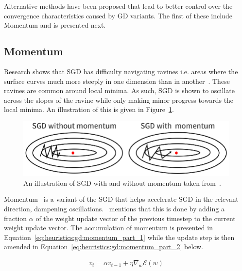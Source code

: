 Alternative methods have been proposed that lead to better control over the convergence characteristics caused by \ac{GD} variants. The first of these include \ac{Momentum} and is presented next.


\subsection{Momentum}
\label{sec:heuristics:gd:momentum}

Research shows that \ac{SGD} has difficulty navigating ravines i.e. areas where the surface curves much more steeply in one dimension than in another~\cite{ref:sutton:1986}. These ravines are common around local minima. As such, \ac{SGD} is shown to oscillate across the slopes of the ravine while only making minor progress towards the local minima. An illustration of this is given in Figure~\ref{fig:heuristics:gd:sgd_with_and_without_momentum}.

\begin{figure}[htbp]
      \includegraphics[width=\textwidth]{images/sgd_with_and_without_momentum.png}
      \caption{An illustration of \ac{SGD} with and without momentum taken from~\cite{ref:du:2019}.}
      \label{fig:heuristics:gd:sgd_with_and_without_momentum}
\end{figure}

Momentum~\cite{ref:qian:1999} is a variant of the \acs{SGD} that helps accelerate \ac{SGD} in the relevant direction, dampening oscillations.~\cite{ref:ruder:2016} mentions that this is done by adding a fraction $\alpha$ of the weight update vector of the previous timestep to the current weight update vector. The accumulation of momentum is presented in Equation~\ref{eq:heuristics:gd:momentum_part_1} while the update step is then amended in Equation~\ref{eq:heuristics:gd:momentum_part_2} below.

\begin{equation}
      \label{eq:heuristics:gd:momentum_part_1}
      \begin{split}
            v_{t} = \alpha v_{t-1} + \eta \nabla_{w}\mathcal{E}(w)
      \end{split}
\end{equation}

